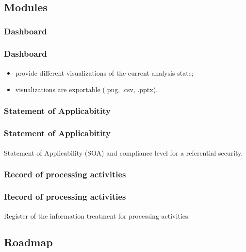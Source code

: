 \subsection{Modules}
\subsubsection{Dashboard}
\begin{frame}
  \frametitle{Dashboard}
  \framesubtitle{}
  \begin{itemize}
    \item provide different visualizations of the current analysis state;
    \item visualizations are exportable (.png, .csv, .pptx).
  \end{itemize}
\end{frame}

\subsubsection{Statement of Applicabitity}
\begin{frame}
  \frametitle{Statement of Applicabitity}
  \framesubtitle{}
  Statement of Applicability (SOA) and compliance level for a referential security.
\end{frame}

\subsubsection{Record of processing activities}
\begin{frame}
  \frametitle{Record of processing activities}
  \framesubtitle{}
  Register of the information treatment for processing activities.
\end{frame}



\subsection{Roadmap}
